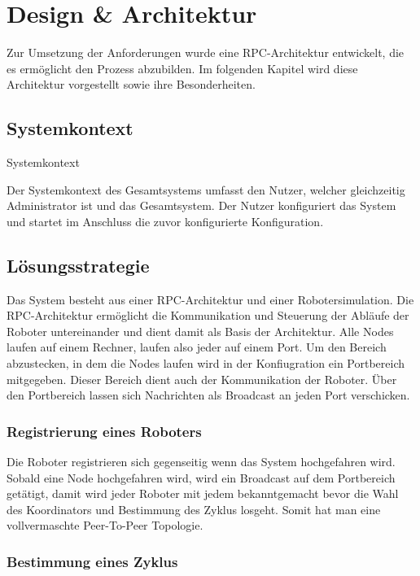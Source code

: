 %
\chapter{Design \& Architektur}

Zur Umsetzung der Anforderungen wurde eine RPC-Architektur entwickelt, die es ermöglicht den Prozess
abzubilden. Im folgenden Kapitel wird diese Architektur vorgestellt sowie ihre Besonderheiten.

\section{Systemkontext}

 {Systemkontext}

Der Systemkontext des Gesamtsystems umfasst den Nutzer, welcher gleichzeitig Administrator ist und das
Gesamtsystem. Der Nutzer konfiguriert das System und startet im Anschluss die zuvor
konfigurierte Konfiguration.
\clearpage

\section{Lösungsstrategie}

Das System besteht aus einer RPC-Architektur und einer Robotersimulation. Die RPC-Architektur ermöglicht
die Kommunikation und Steuerung der Abläufe der Roboter untereinander und dient damit als Basis der
Architektur. Alle Nodes laufen auf einem Rechner, laufen also jeder auf einem Port.
Um den Bereich abzustecken, in dem die Nodes laufen wird in der Konfiugration ein Portbereich mitgegeben.
Dieser Bereich dient auch der Kommunikation der Roboter. Über den Portbereich lassen sich Nachrichten
als Broadcast an jeden Port verschicken.

\subsection{Registrierung eines Roboters}

Die Roboter registrieren sich gegenseitig wenn das System hochgefahren wird. Sobald eine Node hochgefahren
wird, wird ein Broadcast auf dem Portbereich getätigt, damit wird jeder Roboter mit jedem bekanntgemacht
bevor die Wahl des Koordinators und Bestimmung des Zyklus losgeht. Somit hat man eine vollvermaschte
Peer-To-Peer Topologie.

\subsection{Bestimmung eines Zyklus}

